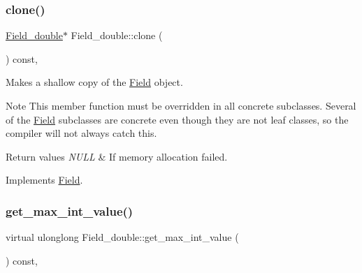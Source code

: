 \mbox{\label{classField__double_aaddb916e4e4853341ee54dc9d5b43f55}} 
\subsubsection{\texorpdfstring{clone()}{clone()}\hspace{0.1cm}{\footnotesize\ttfamily [2/2]}}
{\footnotesize\ttfamily \mbox{\hyperlink{classField__double}{Field\+\_\+double}}$\ast$ Field\+\_\+double\+::clone (\begin{DoxyParamCaption}{ }\end{DoxyParamCaption}) const\hspace{0.3cm}{\ttfamily [inline]}, {\ttfamily [virtual]}}

Makes a shallow copy of the \mbox{\hyperlink{classField}{Field}} object.

\begin{DoxyNote}{Note}
This member function must be overridden in all concrete subclasses. Several of the \mbox{\hyperlink{classField}{Field}} subclasses are concrete even though they are not leaf classes, so the compiler will not always catch this.
\end{DoxyNote}

\begin{DoxyRetVals}{Return values}
{\em N\+U\+LL} & If memory allocation failed. \\
\hline
\end{DoxyRetVals}


Implements \mbox{\hyperlink{classField_a01a9a9aa3a618941e839b1b8793c969d}{Field}}.

\mbox{\label{classField__double_a1b4d62698e48975973a6cd5ec77c9a6a}} 
\subsubsection{\texorpdfstring{get\+\_\+max\+\_\+int\+\_\+value()}{get\_max\_int\_value()}}
{\footnotesize\ttfamily virtual ulonglong Field\+\_\+double\+::get\+\_\+max\+\_\+int\+\_\+value (\begin{DoxyParamCaption}{ }\end{DoxyParamCaption}) const\hspace{0.3cm}{\ttfamily [inline]}, {\ttfamily [virtual]}}

